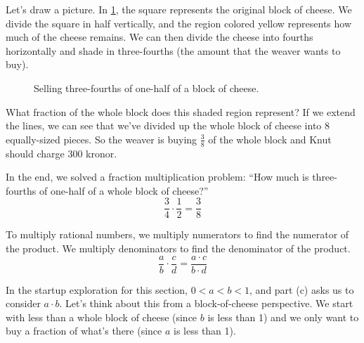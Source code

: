 Let's draw a picture. In \cref{fig:fracmult}, the square represents the original block of cheese. We divide the square in half vertically, and the region colored yellow represents how much of the cheese remains. We can then divide the cheese into fourths horizontally and shade in three-fourths (the amount that the weaver wants to buy).

\begin{figure}[!htbp]
\centering
{}
\caption{Selling three-fourths of one-half of a block of cheese.}
\label{fig:fracmult}
\end{figure}

What fraction of the whole block does this shaded region represent? If we extend the lines, we can see that we've divided up the whole block of cheese into 8 equally-sized pieces. So the weaver is buying $\frac{3}{8}$ of the whole block and Knut should charge 300 kronor.

In the end, we solved a fraction multiplication problem: ``How much is three-fourths of one-half of a whole block of cheese?'' \[\frac{3}{4} \cdot \frac{1}{2} = \frac{3}{8}\] 

\begin{boxdef}
To multiply rational numbers, we multiply numerators to find the numerator of the product. We multiply denominators to find the denominator of the product. \[\frac{a}{b} \cdot \frac{c}{d} = \frac{a \cdot c}{b \cdot d}\]
\end{boxdef}

In the startup exploration for this section, $0 < a < b < 1$, and part (c) asks us to consider $a \cdot b$. Let's think about this from a block-of-cheese perspective. We start with less than a whole block of cheese (since $b$ is less than 1) and we only want to buy a fraction of what's there (since $a$ is less than 1).

